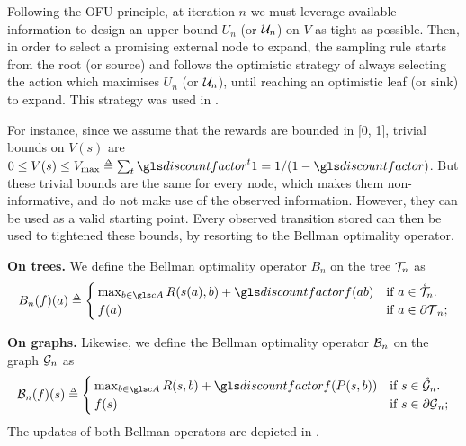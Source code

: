 Following the \gls{OFU} principle, at iteration $n$ we must leverage available information to design an upper-bound $U_n$ (or $\mathcal{U}_n$) on $V$ as tight as possible. Then, in order to select a promising external node to expand, the sampling rule starts from the root (or source) and follows the optimistic strategy of always selecting the action which maximises $U_n$ (or $\mathcal{U}_n$), until reaching an optimistic leaf (or sink) to expand. This strategy was used in \citep[e.g.][]{Kocsis06UCT, Hren2008, Bubeck2010, Busoniu2012optimistic}.

For instance, since we assume that the rewards are bounded in [0, 1], trivial bounds on $V(s)$ are
$0 \leq V(s) \leq V_{\max} \eqdef \sum_t \discount^t 1 ={1}/({1-\discount})$. But these trivial bounds are the same for every node, which makes them non-informative, and do not make use of the observed information. However, they can be used as a valid starting point. Every observed transition stored can then be used to tightened these bounds, by resorting to the Bellman optimality operator.

\begin{definition}
	\begin{leftbar}[defnbar]
	\label{def:bellman}
	{\textbf{On trees.}} We define the Bellman optimality operator $B_n$ on the tree $\mathcal{T}_n$ as
	\begin{equation}
	\label{eq:bellman-tree}
	B_n(f)(a) \eqdef \begin{cases}
	\max_{b\in \cA} R(s(a), b) + \discount f({ab})
	& \text{if $a\in\inte{\Tau}_n$.} \\
	f(a) & \text{if $a\in\ext{\Tau}_n$;}
	\end{cases}
	\end{equation}
	
	{\textbf{On graphs.}} Likewise, we define the Bellman optimality operator $\mathcal{B}_n$ on the graph $\mathcal{G}_n$ as
	\begin{equation}
	\label{eq:bellman-graph}
	\cB_n(f)(s) \eqdef \begin{cases}
	\max_{b\in \cA} R(s, b) + \discount f(P(s,b))
	& \text{if $s\in\inte{\cG}_n$.} \\
	f(s) & \text{if $s\in\ext{\cG}_n$;}
	\end{cases}
	\end{equation}
	The updates of both Bellman operators are depicted in .
	\end{leftbar}
\end{definition}

